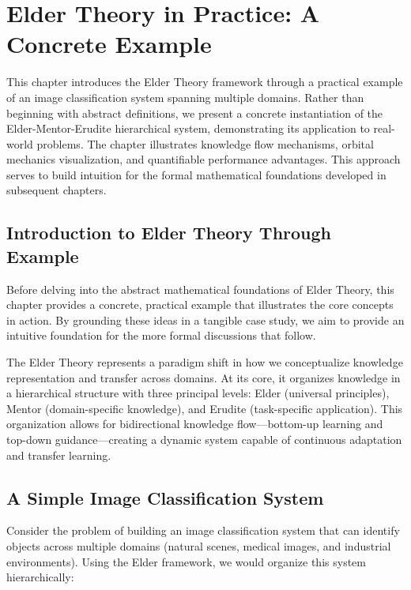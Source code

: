\chapter{Elder Theory in Practice: A Concrete Example}

\begin{tcolorbox}[colback=DarkSkyBlue!5!white,colframe=DarkSkyBlue!75!black,title=Chapter Summary]
This chapter introduces the Elder Theory framework through a practical example of an image classification system spanning multiple domains. Rather than beginning with abstract definitions, we present a concrete instantiation of the Elder-Mentor-Erudite hierarchical system, demonstrating its application to real-world problems. The chapter illustrates knowledge flow mechanisms, orbital mechanics visualization, and quantifiable performance advantages. This approach serves to build intuition for the formal mathematical foundations developed in subsequent chapters.
\end{tcolorbox}

\section{Introduction to Elder Theory Through Example}

Before delving into the abstract mathematical foundations of Elder Theory, this chapter provides a concrete, practical example that illustrates the core concepts in action. By grounding these ideas in a tangible case study, we aim to provide an intuitive foundation for the more formal discussions that follow.

The Elder Theory represents a paradigm shift in how we conceptualize knowledge representation and transfer across domains. At its core, it organizes knowledge in a hierarchical structure with three principal levels: Elder (universal principles), Mentor (domain-specific knowledge), and Erudite (task-specific application). This organization allows for bidirectional knowledge flow—bottom-up learning and top-down guidance—creating a dynamic system capable of continuous adaptation and transfer learning.

\section{A Simple Image Classification System}

Consider the problem of building an image classification system that can identify objects across multiple domains (natural scenes, medical images, and industrial environments). Using the Elder framework, we would organize this system hierarchically:

